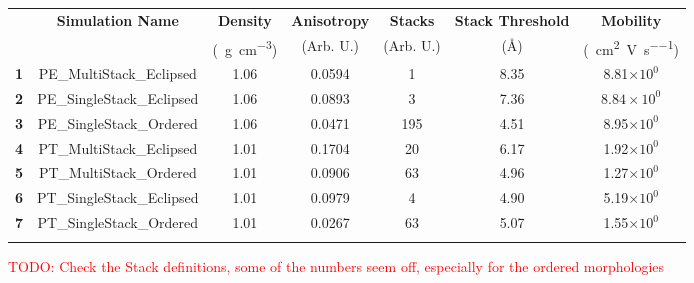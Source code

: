 \documentclass[12pt]{article}
\def\mobunits{\square\centi\meter\per\volt\per\second}
\def\gcm{\gram\per\cubic\centi\meter}
\def\ccg{\cellcolor{gray}}
\begin{document}
\begin{center}
\begin{adjustbox}{max width = \textwidth}
\begin{tabular}{| c | c | c | c | c | c | c |}
\hline
\rule{0pt}{2.5ex} 
\multirow{2}{*}{\textbf{ID}}&\multirow{2}{*}{\textbf{Simulation Name}}&\textbf{Density}&\textbf{Anisotropy}&\textbf{Stacks}&\textbf{Stack Threshold}&\textbf{Mobility}\\
                            &&(\SI{}{\gcm})&(Arb. U.)&(Arb. U.)&(\AA)&(\SI{}{\mobunits})\\
\hhline{|=======|}
\textbf{\ccg1}&\rule{0pt}{2.5ex}\ccg PE\_MultiStack\_Eclipsed&\ccg 1.06&\ccg 0.0594&\ccg 1&\ccg8.35&\ccg8.81$\times 10^{0}$\\
\textbf{2}&\rule{0pt}{2.5ex}PE\_SingleStack\_Eclipsed&1.06&0.0893&3&7.36&$8.84\times 10^{0}$\\
\textbf{\ccg3}&\rule{0pt}{2.5ex}\ccg PE\_SingleStack\_Ordered&\ccg 1.06&\ccg 0.0471&\ccg195&\ccg4.51&\ccg8.95$\times 10^{0}$\\
\hhline{|=======|}
\textbf{4}&\rule{0pt}{2.5ex}PT\_MultiStack\_Eclipsed&1.01&0.1704&20&6.17&1.92$\times 10^{0}$\\
\textbf{\ccg5}&\rule{0pt}{2.5ex}\ccg PT\_MultiStack\_Ordered&\ccg 1.01&\ccg 0.0906&\ccg63&\ccg4.96&\ccg1.27$\times 10^{0}$\\
\textbf{6}&\rule{0pt}{2.5ex}PT\_SingleStack\_Eclipsed&1.01&0.0979&4&4.90&5.19$\times 10^{0}$\\
\textbf{\ccg7}&\rule{0pt}{2.5ex}\ccg PT\_SingleStack\_Ordered&\ccg 1.01&\ccg 0.0267&\ccg63&\ccg5.07&\ccg1.55$\times 10^{0}$\\
\hhline{-------}
\end{tabular}\label{table:mob}
\end{adjustbox}
\end{center}

\clearpage


\textcolor{red}{TODO: Check the Stack definitions, some of the numbers seem off, especially for the ordered morphologies}
\end{document}
